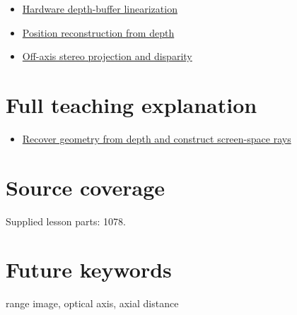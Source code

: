 \begin{itemize}
\tightlist
\item
  \hyperref[appendix-1bc40b08db4a]{Hardware depth-buffer linearization}
\item
  \hyperref[appendix-2cbf2968e866]{Position reconstruction from depth}
\item
  \hyperref[appendix-0976e86e5b9f]{Off-axis stereo projection and disparity}
\end{itemize}

\section{Full teaching explanation}\label{appendix-cac01ebeeb11-full-teaching-explanation}

\begin{itemize}
\tightlist
\item
  \href{Continuous\%20Notes/Computing\%20Foundations\%20-\%20From\%20Bits\%20to\%20C++\%20and\%20Systems\%20APIs\#Recover\%20geometry\%20from\%20depth\%20and\%20construct\%20screen-space\%20rays}{Recover geometry from depth and construct screen-space rays}
\end{itemize}

\section{Source coverage}\label{appendix-cac01ebeeb11-source-coverage}

Supplied lesson parts: 1078.

\section{Future keywords}\label{appendix-cac01ebeeb11-future-keywords}

range image, optical axis, axial distance
